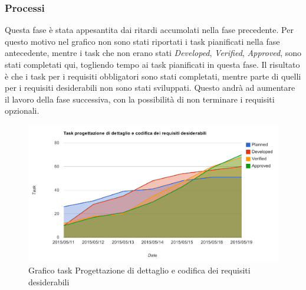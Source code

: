 		\subsubsection{Processi}
		Questa fase è stata appesantita dai ritardi accumolati nella fase precedente. Per questo motivo nel grafico non sono stati riportati i task pianificati nella fase antecedente, mentre i task che non erano stati \textit{Developed}, \textit{Verified}, \textit{Approved}, sono stati completati qui, togliendo tempo ai task pianificati in questa fase. Il risultato è che i task per i requisiti obbligatori sono stati completati, mentre parte di quelli per i requisiti desiderabili non sono stati sviluppati. Questo andrà ad aumentare il lavoro della fase successiva, con la possibilità di non terminare i requisiti opzionali.
			\begin{figure}[htbp]
				\centering
				\centerline{\includegraphics[scale=0.7]{images/Grafico_fase_6.pdf}}
				\caption{Grafico task Progettazione di dettaglio e codifica dei requisiti desiderabili}
				\label{fig:taskfase6}
			\end{figure}
			
